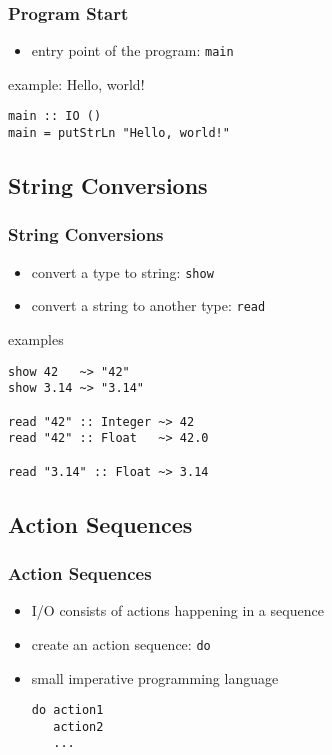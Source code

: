 \documentclass[dvipsnames]{beamer}
\theoremstyle{plain}
\begin{document}
\begin{frame}[fragile]
  \frametitle{Program Start}

  \begin{itemize}
    \item entry point of the program: \lstinline|main|
  \end{itemize}

  \medskip
  \begin{exampleblock}{example: Hello, world!}
    \begin{lstlisting}
main :: IO ()
main = putStrLn "Hello, world!"
    \end{lstlisting}
  \end{exampleblock}
\end{frame}

\subsection{String Conversions}

\begin{frame}[fragile]
  \frametitle{String Conversions}

  \begin{itemize}
    \item convert a type to string: \lstinline|show|
    \item convert a string to another type: \lstinline|read|
  \end{itemize}

  \begin{exampleblock}{examples}
    \begin{lstlisting}
show 42   ~> "42"
show 3.14 ~> "3.14"

read "42" :: Integer ~> 42
read "42" :: Float   ~> 42.0

read "3.14" :: Float ~> 3.14
    \end{lstlisting}
  \end{exampleblock}
\end{frame}

\subsection{Action Sequences}

\begin{frame}[fragile]
  \frametitle{Action Sequences}

  \begin{itemize}
    \item I/O consists of \alert{actions} happening in a sequence
    \item create an action sequence: \lstinline|do|
    \item small imperative programming language

    \medskip
    \begin{lstlisting}
do action1
   action2
   ...
    \end{lstlisting}
  \end{itemize}
\end{frame}
\end{document}
